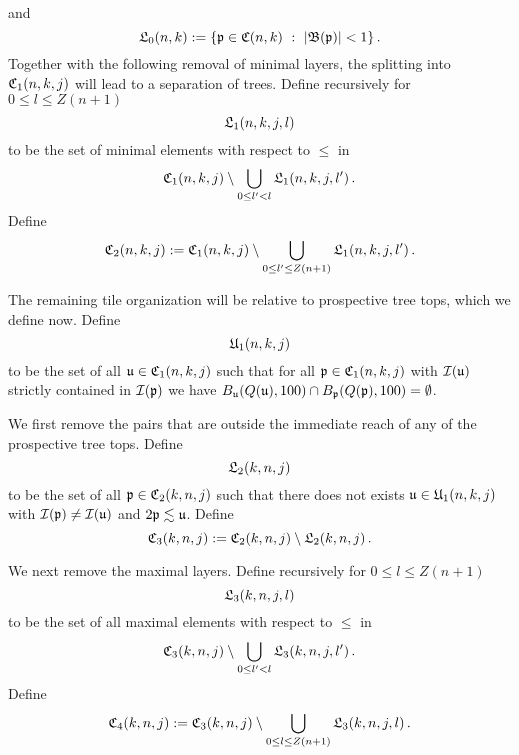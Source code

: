 and
\begin{equation}\label{defl0nk}
        \mathfrak L_0(n,k) := \{\mathfrak p \in \mathfrak C(n,k) \ : \ |\mathfrak{B}(\mathfrak p)| <1\}\,.
\end{equation}
Together with the following removal of minimal layers, the splitting into $\mathfrak C_1(n,k,j)$ will lead to a separation of  trees.
Define recursively for $0\le l\le Z(n+1)$
\begin{equation}
    \label{eq L1 def}
    \mathfrak L_1(n,k,j,l)
\end{equation}
to be the set of minimal elements with respect to $\le$ in
\begin{equation}
    \mathfrak C_1(n,k,j)\setminus \bigcup_{0\le l'<l}
\mathfrak L_1(n,k,j,l')\, .
\end{equation}
Define 
\begin{equation}
    \label{eq C2 def}
    \mathfrak C_2(n,k,j):= \mathfrak C_1(n,k,j)\setminus \bigcup_{0\le l'\le Z(n+1)}
\mathfrak L_1(n,k,j,l')\, .
\end{equation}

The remaining tile organization will be relative to
prospective tree tops, which we define now.
Define
\begin{equation}\label{defunkj}
        \mathfrak U_1(n,k,j)
\end{equation}
to be the set of all
$\mathfrak u \in \mathfrak C_1(n,k,j)$ such that
for all $\mathfrak p \in \mathfrak C_1(n,k,j)$
with  $\mathcal{I}(\mathfrak u)$ strictly contained in
$\mathcal{I}(\mathfrak p)$ we have $B_{\mathfrak u}(Q(\mathfrak u), 100) \cap B_{\mathfrak p}(Q(\mathfrak p),100) = \emptyset$.

We first remove the pairs that are outside the immediate reach of any of the prospective tree tops.
Define
\begin{equation}
\label{eq L2 def}
\mathfrak L_2(k,n,j)
\end{equation}
to be the set of all $\mathfrak p\in \mathfrak C_2(k,n,j)$ such that there
does not exists
$\mathfrak u\in \mathfrak U_1(n,k,j)$
with $\mathcal{I}(\mathfrak p)\neq \mathcal{I}(\mathfrak u)$ and $2\mathfrak p\lesssim \mathfrak u$.
Define
\begin{equation}
\label{eq C3 def}
\mathfrak C_3(k,n,j):=\mathfrak C_2(k,n,j)
    \setminus \mathfrak L_2(k,n,j)\, .
\end{equation}


We next remove the maximal layers.
Define recursively for $0 \le l \le Z(n+1)$
\begin{equation}
    \label{eq L3 def}
    \mathfrak L_3(k,n,j,l)
\end{equation}
to be the set of all maximal elements with respect to $\le$ in
\begin{equation}
    \mathfrak C_3(k,n,j) \setminus \bigcup_{0 \le l' < l} \mathfrak L_3(k,n,j,l')\,.
\end{equation}
Define
\begin{equation}
\label{eq C4 def}
\mathfrak C_4(k,n,j):=\mathfrak C_3(k,n,j)
    \setminus \bigcup_{0 \le l \le Z(n+1)} \mathfrak L_3(k,n,j,l)\,.
\end{equation}

